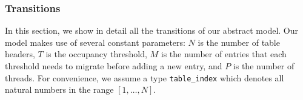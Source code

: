 \subsubsection{Transitions}

In this section, we show in detail all the transitions of our abstract
model. Our model makes use of several constant parameters: $N$ is the
number of table headers, $T$ is the occupancy threshold, $M$ is the number of
entries that each threshold needs to migrate before adding a new
entry, and $P$ is the number of threads. For convenience, we assume a
type \texttt{table\_index} which denotes all natural numbers in the
range $[1,\ldots,N]$.


